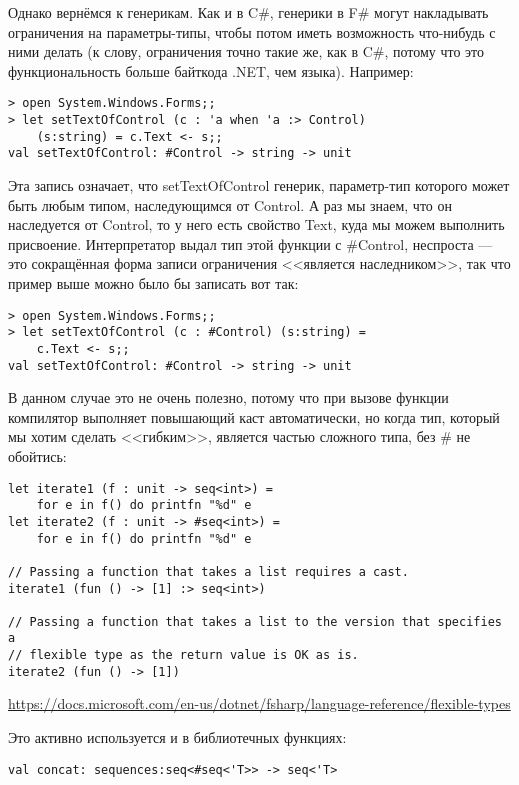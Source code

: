 \documentclass[a5paper]{article}
\newcommand{\attribution}[1] {
    \begin{flushright}\begin{scriptsize}\textcolor{gray}{#1}\end{scriptsize}\end{flushright}
}
\begin{document}
Однако вернёмся к генерикам. Как и в C\#, генерики в F\# могут накладывать ограничения на параметры-типы, чтобы потом иметь возможность что-нибудь с ними делать (к слову, ограничения точно такие же, как в C\#, потому что это функциональность больше байткода .NET, чем языка). Например:

\begin{verbatim}
> open System.Windows.Forms;;
> let setTextOfControl (c : 'a when 'a :> Control) 
    (s:string) = c.Text <- s;;
val setTextOfControl: #Control -> string -> unit
\end{verbatim}

Эта запись означает, что setTextOfControl генерик, параметр-тип которого может быть любым типом, наследующимся от Control. А раз мы знаем, что он наследуется от Control, то у него есть свойство Text, куда мы можем выполнить присвоение. Интерпретатор выдал тип этой функции с \#Control, неспроста --- это сокращённая форма записи ограничения <<является наследником>>, так что пример выше можно было бы записать вот так: 

\begin{verbatim}
> open System.Windows.Forms;;
> let setTextOfControl (c : #Control) (s:string) = 
    c.Text <- s;;
val setTextOfControl: #Control -> string -> unit
\end{verbatim}

В данном случае это не очень полезно, потому что при вызове функции компилятор выполняет повышающий каст автоматически, но когда тип, который мы хотим сделать <<гибким>>, является частью сложного типа, без \# не обойтись:

\begin{verbatim}
let iterate1 (f : unit -> seq<int>) =
    for e in f() do printfn "%d" e
let iterate2 (f : unit -> #seq<int>) =
    for e in f() do printfn "%d" e

// Passing a function that takes a list requires a cast.
iterate1 (fun () -> [1] :> seq<int>)

// Passing a function that takes a list to the version that specifies a
// flexible type as the return value is OK as is.
iterate2 (fun () -> [1])
\end{verbatim}
\attribution{\url{https://docs.microsoft.com/en-us/dotnet/fsharp/language-reference/flexible-types}}

Это активно используется и в библиотечных функциях:

\begin{verbatim}
val concat: sequences:seq<#seq<'T>> -> seq<'T>
\end{verbatim}
\end{document}
